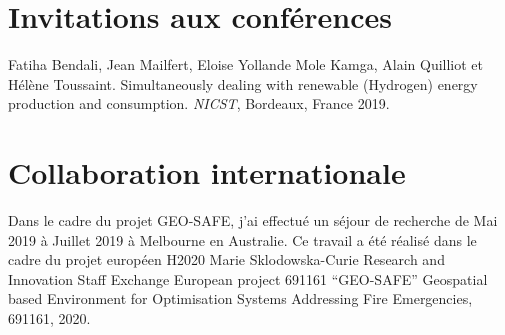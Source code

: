 \documentclass[11pt,a4paper]{report}
\begin{document}
\section*{Invitations aux conférences}	
Fatiha Bendali, Jean Mailfert, Eloise Yollande Mole Kamga, Alain Quilliot et Hélène Toussaint.
\newblock Simultaneously dealing with renewable (Hydrogen) energy production and consumption.
\newblock \textit{NICST}, Bordeaux, France 2019.

\section*{Collaboration internationale}

Dans le cadre du projet GEO-SAFE, j'ai effectué un séjour de recherche de Mai 2019 à Juillet 2019 à Melbourne en Australie. Ce travail a été réalisé dans le cadre du projet européen H2020 Marie Sklodowska-Curie Research and Innovation Staff Exchange European project 691161 “GEO-SAFE”
Geospatial based Environment for Optimisation Systems Addressing Fire Emergencies, 691161, 2020.

\newpage
\tableofcontents
\newpage
\listofalgorithms %
\newpage
\listoffigures
{} 
\newpage
\listoftables
{} 
\newpage









\end{document}

